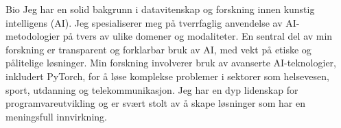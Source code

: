 \begin{rubric}{Bio}
\entry*[]
Jeg har en solid bakgrunn i datavitenskap og forskning innen kunstig intelligens (AI). Jeg spesialiserer meg på tverrfaglig anvendelse av AI-metodologier på tvers av ulike domener og modaliteter. En sentral del av min forskning er transparent og forklarbar bruk av AI, med vekt på etiske og pålitelige løsninger. Min forskning involverer bruk av avanserte AI-teknologier, inkludert PyTorch, for å løse komplekse problemer i sektorer som helsevesen, sport, utdanning og telekommunikasjon. Jeg har en dyp lidenskap for programvareutvikling og er svært stolt av å skape løsninger som har en meningsfull innvirkning.
\end{rubric}
